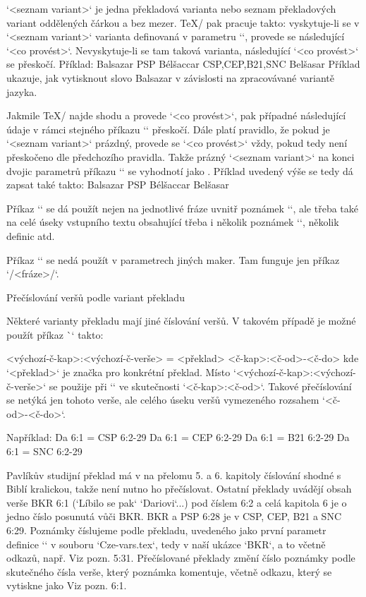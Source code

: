 `<seznam variant>` je
jedna překladová varianta nebo seznam překladových variant oddělených
čárkou a bez mezer. \TeX/ pak pracuje takto: vyskytuje-li
se v `<seznam variant>` varianta definovaná v parametru `\tmark`, provede se
následující `<co provést>`. Nevyskytuje-li se tam taková varianta,
následující `<co provést>` se přeskočí. Příklad:
\begtt
{} {Balsazar}%
        {PSP} {Bélšaccar}%
        {CSP,CEP,B21,SNC} {Belšasar}
\endtt
Příklad ukazuje, jak vytisknout slovo Balsazar v závislosti na
zpracovávané variantě jazyka.

Jakmile \TeX/ najde shodu a provede `<co provést>`, pak případné následující
údaje v rámci stejného příkazu `\switch` přeskočí. Dále platí pravidlo, že
pokud je `<seznam variant>` prázdný, provede se `<co provést>` vždy, pokud
tedy není přeskočeno dle předchozího pravidla. Takže prázný `<seznam variant>` na
konci dvojic parametrů příkazu `\switch` se vyhodnotí jako . Příklad uvedený výše se tedy dá zapsat také takto:
\begtt
{} {Balsazar}%
        {PSP} {Bélšaccar}%
        {}    {Belšasar}
\endtt

Příkaz `\switch` se dá použít nejen na jednotlivé fráze uvnitř poznámek
`\Note`, ale třeba také na celé úseky vstupního textu obsahující třeba i
několik poznámek `\Note`, několik definic atd.

Příkaz `\switch` se nedá použít v parametrech jiných maker. Tam funguje jen
příkaz `\x/<fráze>/`.



\secc[renum] Přečíslování veršů podle variant překladu

Některé varianty překladu mají jiné číslování veršů. V takovém případě je
možné použít příkaz \`\renum` takto:

\begtt
{} <výchozí-č-kap>:<výchozí-č-verše> = <překlad> <č-kap>:<č-od>-<č-do>
\endtt
kde `<překlad>` je značka pro konkrétní překlad.
Místo `<výchozí-č-kap>:<výchozí-č-verše>` se použije při `\def\tmark{<překlad>}`
ve skutečnosti `<č-kap>:<č-od>`.
Takové přečíslování se netýká jen
tohoto verše, ale celého úseku veršů vymezeného rozsahem `<č-od>-<č-do>`.

Například:
\begtt
\renum Da 6:1 = CSP  6:2-29
\renum Da 6:1 = CEP  6:2-29
\renum Da 6:1 = B21  6:2-29
\renum Da 6:1 = SNC  6:2-29
\endtt

Pavlíkův studijní překlad má v na přelomu 5. a 6. kapitoly číslování shodné s Biblí kralickou, takže není nutno ho přečíslovat.
Ostatní překlady uvádějí obsah verše BKR 6:1 (`Líbilo se pak` `Dariovi`...)
pod číslem 6:2 a celá kapitola 6 je o jedno číslo posunutá vůči BKR. BKR a PSP 6:28 je v CSP, CEP, B21 a SNC 6:29.
Poznámky číslujeme podle překladu, uvedeného jako první parametr definice `\variants` v souboru `Cze-vars.tex`, tedy v naší ukázce `BKR`, a to včetně odkazů, např. Viz pozn. 5:31.
Přečíslované překlady změní číslo poznámky podle skutečného čísla verše, který poznámka komentuje,  včetně odkazu, který se vytiskne jako  Viz pozn. 6:1.

